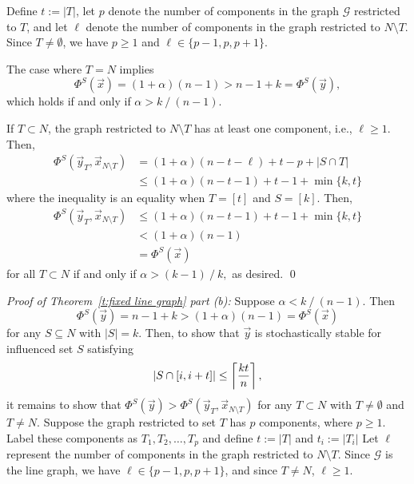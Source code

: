 Define $t:=|T|$, let $p$ denote the number of components in the graph $\mathcal{G}$ restricted to $T$, and let $\ell$ denote the number of components in the graph restricted to $N\setminus T$. Since $T\neq \emptyset$, we have $p\geq 1$ and $\ell \in \{p-1,p,p+1\}$. 

The case where $T = N$ implies 
\begin{equation*}
\Phi^S(\vec{x}) = (1+\alpha)(n-1) >n-1+k = \Phi^S(\vec{y}),
\end{equation*}
which holds if and only if 
$\alpha > {k\mathop{/}(n-1)}.$

If $T\subset N$, the graph restricted to $N\setminus T$ has at least one component, i.e., $\ell\geq 1$. Then,
\begin{align}
\Phi^S(\vec{y}_T,\vec{x}_{N\setminus T}) %
&= (1+\alpha)(n-t-\ell) + t-p + |S\cap T|\nonumber\\
&\leq (1+\alpha)(n-t-1) + t-1 + \min\{k,t\}\nonumber
\end{align}
where the inequality is an equality when $T = [t]$ and $S = [k].$ Then, 
\begin{align*}
\Phi^S(\vec{y}_T,\vec{x}_{N\setminus T})&\leq (1+\alpha)(n-t-1) + t-1 + \min\{k,t\} \\
&< (1+\alpha)(n-1) \\
&= \Phi^S(\vec{x})
\end{align*}
for all $T\subset N$ if and only if 
$\alpha >{(k-1)\mathop{/} k},$ as desired.
 \hfill\qed



%
\noindent\emph{Proof of Theorem~\ref{t:fixed line graph} part (b):}
Suppose $\alpha < {k\mathop{/}(n-1)}.$ Then 
$$\Phi^S(\vec{y}) = n-1+k > (1+\alpha)(n-1) = \Phi^S(\vec{x})$$
for any $S\subseteq N$ with $|S| = k.$ Then, to show that $\vec{y}$ is stochastically stable for influenced set $S$ satisfying
$$\left|S\cap [i,i+t]\right| \leq \left\lceil {kt\over n}\right\rceil,$$
it remains to show that 
$\Phi^S(\vec{y}) > \Phi^S(\vec{y}_T,\vec{x}_{N\setminus T})$
for any $T\subset N$ with $T\neq \emptyset$ and $T\neq N.$ Suppose the graph restricted to set $T$ has $p$ components, where $p\geq 1.$ Label these components as $T_1,T_2,\ldots,T_p$ and define $t:=|T|$ and $t_i:=|T_i|$ Let $\ell$ represent the number of components in the graph restricted to $N\setminus T.$ Since $\mathcal{G}$ is the line graph, we have $\ell\in \{p-1,p,p+1\}$, and since $T\neq N$, $\ell \geq 1.$ 


